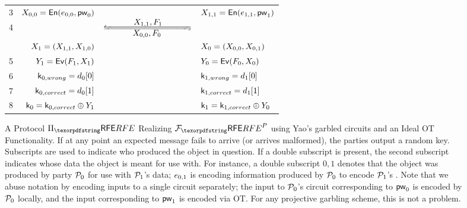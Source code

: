 \begin{figure}[tb]
\begin{fboxenv}
\begin{tabular}{lrcl}
    3 & $X_{0,0} = \mathsf{En}(e_{0,0}, \mathsf{pw}_{0})$ & & $X_{1,1} = \mathsf{En}(e_{1,1}, \mathsf{pw}_{1})$ \\
    4 & &  $\LRsbflow{\ginp_{\firstindex,\firstindex}, \gfunc_\firstindex}{\ginp_{\secondindex,\secondindex}, \gfunc_{\secondindex}}$ & \\
     & $X_{1} = (X_{1,1}, X_{1,0})$ &  & $X_{0} = (X_{0,0}, X_{0,1})$ \\
    5 & $Y_{1} = \mathsf{Ev}(F_{1}, X_{1})$ & & $Y_{0} = \mathsf{Ev}(F_{0}, X_{0})$ \\
    6 & $\mathsf{k}_{0, wrong} = d_{0}[0]$ & & $\mathsf{k}_{1, wrong} = d_{1}[0]$ \\
    7 & $\mathsf{k}_{0, correct} = d_{0}[1]$ & & $\mathsf{k}_{1, correct} = d_{1}[1]$ \\
    8 & $\mathsf{k}_{0} = \mathsf{k}_{0, correct} \oplus Y_{1}$ & & $\mathsf{k}_{1} = \mathsf{k}_{1, correct} \oplus 
   Y_{0}$ \\
    \end{tabular}
   \end{fboxenv}
  \caption{A Protocol $\Prfe$ Realizing $\Frfe^{P}$ using Yao's garbled circuits and an Ideal OT Functionality.
  If at any point an expected message fails to arrive (or arrives malformed), the parties output a random key.
  Subscripts are used to indicate who produced the object in question.
  If a double subscript is present, the second subscript indicates whose data the object is meant for use with. 
  For instance, a double subscript $0, 1$ denotes that the object was produced by party $\mathcal{P}_{0}$ for use with $\mathcal{P}_{1}$'s data; $e_{0, 1}$ is encoding information produced by $\mathcal{P}_{0}$ to encode $\mathcal{P}_{1}$'s \password.
Note that we abuse notation by encoding inputs to a single circuit separately; the input to $\mathcal{P}_{0}$'s circuit corresponding to $\mathsf{pw}_{0}$ is encoded by $\mathcal{P}_{0}$ locally, and the input corresponding to $\mathsf{pw}_{1}$ is encoded via OT. 
 For any projective garbling scheme, this is not a problem.}
  \label{fig:YGCRFE}
\end{figure}


